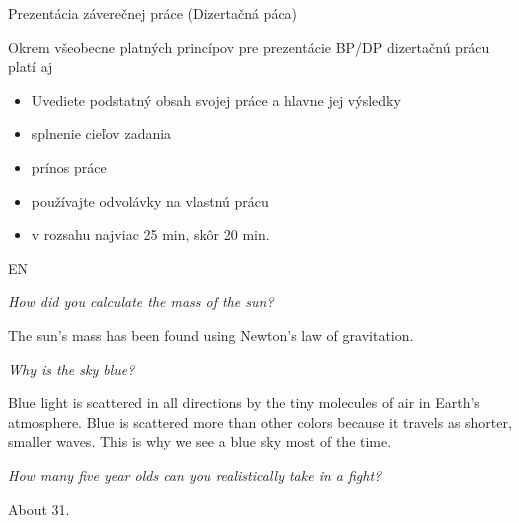 \documentclass{beamer}                              %
\begin{document}
\begin{frame}{Prezentácia záverečnej práce (Dizertačná páca)}

Okrem všeobecne platných princípov pre prezentácie BP/DP dizertačnú prácu platí aj

\begin{itemize}
 \item Uvediete podstatný obsah svojej práce a hlavne jej výsledky
 \item splnenie cieľov zadania
 \item prínos práce
 \item používajte odvolávky na vlastnú prácu
 \item v rozsahu najviac 25 min, skôr 20 min.
\end{itemize}
\end{frame}





\begin{reviewerquestions}{EN} %

{\it How did you calculate the mass of the sun?}

The sun's mass has been found using Newton's law of gravitation.

\framebreak

{\it Why is the sky blue?}

Blue light is scattered in all directions by the tiny molecules of air in Earth's atmosphere. Blue is scattered more than other colors because it travels as shorter, smaller waves. This is why we see a blue sky most of the time.

\framebreak

{\it How many five year olds can you realistically take in a fight?}

About 31.

\end{reviewerquestions}

\end{document}
